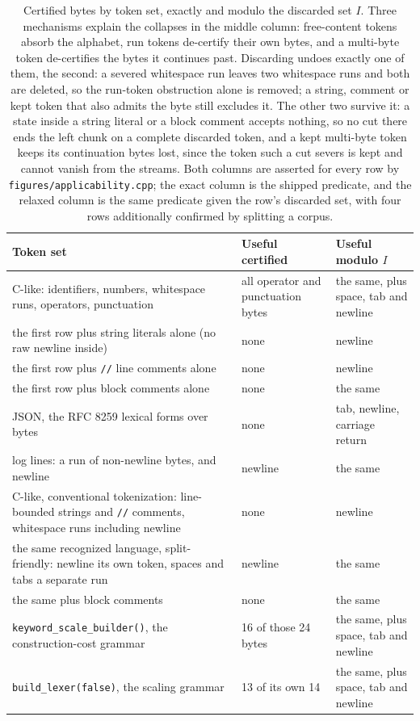 \documentclass[11pt,a4paper]{article}
\theoremstyle{definition}
\theoremstyle{plain}
\newcommand{\code}[1]{\texttt{#1}}
\begin{document}
\begin{table}[t] \centering \begin{tabular}{p{7.0cm}p{3.6cm}p{3.6cm}} \toprule Token set & Useful certified & Useful
modulo $I$ \\ \midrule C-like: identifiers, numbers, whitespace runs, operators, punctuation & all operator and
punctuation bytes & the same, plus space, tab and newline \\ the first row plus string literals alone (no raw newline
inside) & none & newline \\ the first row plus \code{//} line comments alone & none & newline \\ the first row plus
block comments alone & none & the same \\ JSON, the RFC 8259 lexical forms over bytes & none & tab, newline, carriage
return \\ log lines: a run of non-newline bytes, and newline & newline & the same \\ C-like, conventional
tokenization: line-bounded strings and \code{//} comments, whitespace runs including newline & none & newline \\ the
same recognized language, split-friendly: newline its own token, spaces and tabs a separate run & newline & the same
\\ the same plus block comments & none & the same \\ \code{keyword\_scale\_builder()}, the construction-cost grammar &
16 of those 24 bytes & the same, plus space, tab and newline \\ \code{build\_lexer(false)}, the scaling grammar & 13
of its own 14 & the same, plus space, tab and newline \\
\bottomrule
\end{tabular}
\caption{Certified bytes by token
set, exactly and modulo the discarded set $I$. Three mechanisms explain the collapses in the middle column:
free-content tokens absorb the alphabet, run tokens de-certify their own bytes, and a multi-byte token de-certifies
the bytes it continues past. Discarding undoes exactly one of them, the second: a severed whitespace run leaves two
whitespace runs and both are deleted, so the run-token obstruction alone is removed; a string, comment or kept token
that also admits the byte still excludes it. The other two survive it: a state inside a string literal or a block
comment accepts nothing, so no cut there ends the left chunk on a complete discarded token, and a kept multi-byte
token keeps its continuation bytes lost, since the token such a cut severs is kept and cannot vanish from the streams.
Both columns are asserted for every row by \code{figures/applicability.cpp}; the exact column is the shipped
predicate, and the relaxed column is the same predicate given the row's discarded set, with four rows additionally
confirmed by splitting a corpus.}
\label{tab:applicability}
\end{table}
\end{document}

